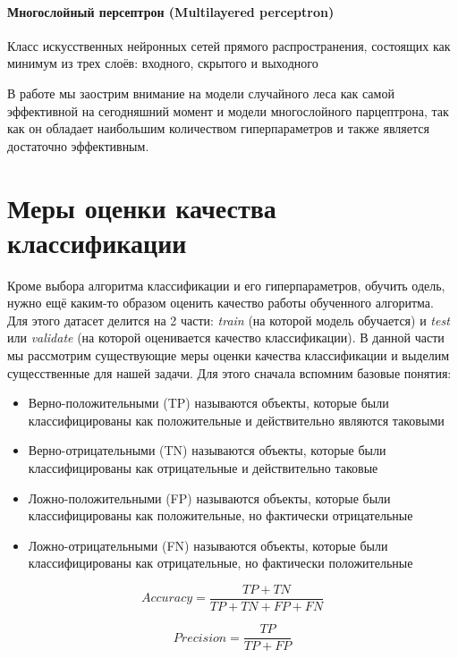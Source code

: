 \documentclass[times,specification,annotation]{itmo-student-thesis}
\begin{document}
	\paragraph{Многослойный персептрон (Multilayered perceptron)} Класс искусственных нейронных сетей прямого распространения, состоящих как минимум из трех слоёв: входного, скрытого и выходного 

	В работе мы заострим внимание на модели случайного леса как самой эффективной на сегодняшний момент и модели многослойного парцептрона, так как он обладает наибольшим количеством гиперпараметров и также является достаточно эффективным.
	
	\section{Меры оценки качества классификации} \label{s:mcl}
	Кроме выбора алгоритма классификации и его гиперпараметров, обучить одель, нужно ещё каким-то образом оценить качество работы обученного алгоритма. Для этого датасет делится на 2 части: \textit{train} (на которой модель обучается) и \textit{test} или \textit{validate} (на которой оценивается качество классификации). В данной части мы рассмотрим существующие меры оценки качества классификации и выделим сущесственные для нашей задачи. Для этого сначала вспомним базовые понятия:
	\begin{itemize}
		\item Верно-положительными (TP) называются объекты, которые были классифицированы как положительные и действительно являются таковыми
		\item Верно-отрицательными (TN) называются объекты, которые были классифицированы как отрицательные и действительно таковые 
		\item Ложно-положительными (FP) называются объекты, которые были классифицированы как положительные, но фактически отрицательные
		\item Ложно-отрицательными (FN) называются объекты, которые были классифицированы как отрицательные, но фактически положительные
	\end{itemize}

	\begin{equation}
	Accuracy = \frac{TP+TN}{TP+TN+FP+FN} 
	\label{eq:accuracy}
	\end{equation}
	
	\begin{equation} 
	Precision = \frac{TP}{TP+FP} 
	\label{eq:precision}
	\end{equation}
	
\end{document}
